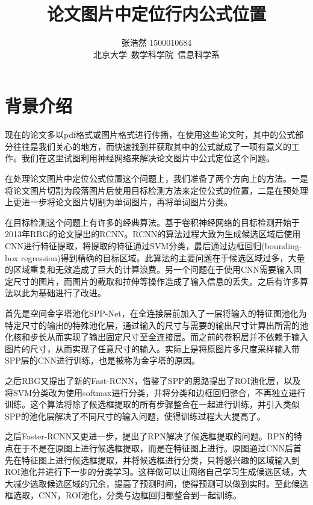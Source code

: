 \documentclass[12pt]{article}
\title{论文图片中定位行内公式位置}
\author{张浩然 1500010684 \\ 北京大学~数学科学院~信息科学系}
\date{}
\begin{document}


\maketitle
\tableofcontents

\abstract{}

\newpage

\section{背景介绍}
\noindent

现在的论文多以pdf格式或图片格式进行传播，在使用这些论文时，其中的公式部分往往是我们关心的地方，而快速找到并获取其中的公式就成了一项有意义的工作。我们在这里试图利用神经网络来解决论文图片中公式定位这个问题。

在处理论文图片中定位公式位置这个问题上，我们准备了两个方向上的方法。一是将论文图片切割为段落图片后使用目标检测方法来定位公式的位置，二是在预处理上更进一步将论文图片切割为单词图片，再将单词图片分类。

在目标检测这个问题上有许多的经典算法。基于卷积神经网络的目标检测开始于2013年RBG的论文\cite{rcnn}提出的RCNN。RCNN的算法过程大致为生成候选区域后使用CNN进行特征提取，将提取的特征通过SVM分类，最后通过边框回归(bounding-box regression)得到精确的目标区域。此算法的主要问题在于候选区域过多，大量的区域重复和无效造成了巨大的计算浪费。另一个问题在于使用CNN需要输入固定尺寸的图片，而图片的截取和拉伸等操作造成了输入信息的丢失。之后有许多算法以此为基础进行了改进。

首先是空间金字塔池化SPP-Net\cite{spp}，在全连接层前加入了一层将输入的特征图池化为特定尺寸的输出的特殊池化层，通过输入的尺寸与需要的输出尺寸计算出所需的池化核和步长从而实现了输出固定尺寸至全连接层。而之前的卷积层并不依赖于输入图片的尺寸，从而实现了任意尺寸的输入。实际上是将原图片多尺度采样输入带SPP层的CNN进行训练，也是被称为金字塔的原因。

之后RBG又提出了新的Fast-RCNN\cite{frcnn}，借鉴了SPP的思路提出了ROI池化层，以及将SVM分类改为使用softmax进行分类，并将分类和边框回归整合，不再独立进行训练。这个算法将除了候选框提取的所有步骤整合在一起进行训练，并引入类似SPP的池化层解决了不同尺寸的输入问题，使得训练过程大大提高了。

之后Faster-RCNN\cite{ftrcnn}又更进一步，提出了RPN解决了候选框提取的问题。RPN的特点在于不是在原图上进行候选框提取，而是在特征图上进行。原图通过CNN后首先在特征图上进行候选框提取，并将候选框进行分类，只将感兴趣的区域输入到ROI池化并进行下一步的分类学习。这样做可以让网络自己学习生成候选区域，大大减少选取候选区域的冗余，提高了预测时间，使得预测可以做到实时。至此候选框选取，CNN，ROI池化，分类与边框回归都整合到一起训练。
\end{document}
